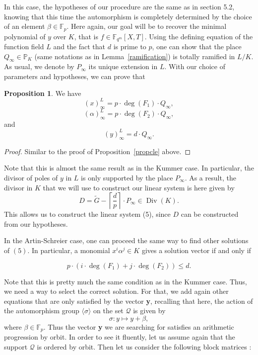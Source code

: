 \documentclass[10pt]{article}
\theoremstyle{definition}
\newtheorem{prop1}[thm]{Proposition}
\theoremstyle{definition}
\theoremstyle{definition}
\newcommand{\s}{\vspace{0.3cm}}
\newcommand{\cd}{\cdot}
\newcommand{\PP}{\mathbb{P}}
\newcommand{\fqm}{\mathbb{F}_{q^m}}
\newcommand{\QR}{\mathcal{Q}}
\newcommand{\Div}{\operatorname{Div}}
\begin{document}
\s

In this case, the hypotheses of our procedure are the same as in section 5.2, knowing that this time the automorphism is completely determined by the choice of an element $\beta \in \mathbb{F}_p$. Here again, our goal will be to recover the minimal polynomial of $y$ over $K$, that is $f \in \fqm[X,T]$. Using the defining equation of the function field $L$ and the fact that $d$ is prime to $p$, one can show that the place $Q_{\infty} \in \PP_K$ (same notations as in Lemma~\ref{ramification}) is totally ramified in $L/K$. As usual, we denote by $P_{\infty}$ its unique extension in $L$. With our choice of parameters and hypotheses, we can prove that

\s

\begin{prop1} \label{propcle2}
We have
\[(x)^L_{\infty} = p \cd \deg(F_1) \cd Q_{\infty},\]
\[(\alpha)^L_{\infty} = p \cd \deg(F_2) \cd Q_{\infty},\]
and
\[(y)^L_{\infty} = d \cd Q_{\infty}.\]
\end{prop1}

\s

\begin{proof}
Similar to the proof of Proposition~\ref{propcle} above.
\end{proof}

\s

Note that this is almost the same result as in the Kummer case. In particular, the divisor of poles of $y$ in $L$ is only supported by the place $P_{\infty}$. As a result, the divisor in $K$ that we will use to construct our linear system is here given by 
\[D = \tilde{G} - \left\lceil\frac{d}{p}\right\rceil \cd P_{\infty} \in \Div(K).\]
This allows us to construct the linear system (5), since $D$ can be constructed from our hypotheses. 

\s

In the Artin-Schreier case, one can proceed the same way to find other solutions of $(5)$. In particular, a monomial $x^i\alpha^j \in K$ gives a solution vector if and only if 

\[p \cd (i \cd \deg(F_1)+j \cd \deg(F_2)) \leq d.\]

Note that this is pretty much the same condition as in the Kummer case. Thus, we need a way to select the correct solution. For that, we add again other equations that are only satisfied by the vector \textbf{y}, recalling that here, the action of the automorphism group $\langle\sigma\rangle$ on the set $\QR$ is given by 
\[\sigma : y \longmapsto y + \beta,\]
where $\beta \in \mathbb{F}_p$. Thus the vector \textbf{y} we are searching for satisfies an arithmetic progression by orbit. In order to see it fluently, let us assume again that the support $\QR$ is ordered by orbit. Then let us consider the following block matrices :
\end{document}

